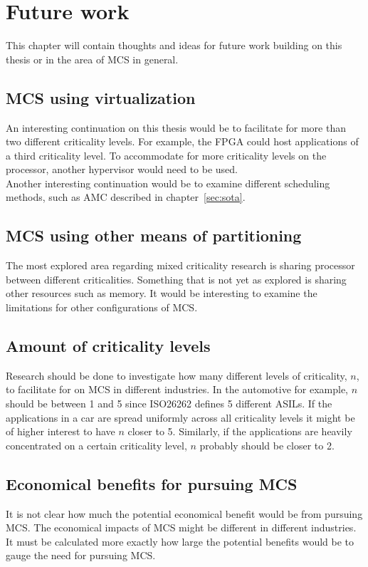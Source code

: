 \chapter{Future work}
\label{sec:future_work}
This chapter will contain thoughts and ideas for future work building on this thesis or in the area of MCS in general.

\section{MCS using virtualization}
An interesting continuation on this thesis would be to facilitate for more than two different criticality levels. For example, the FPGA could host applications of a third criticality level. To accommodate for more criticality levels on the processor, another hypervisor would need to be used.\\

Another interesting continuation would be to examine different scheduling methods, such as AMC described in chapter~\ref{sec:sota}.

\section{MCS using other means of partitioning}
The most explored area regarding mixed criticality research is sharing processor between different criticalities. Something that is not yet as explored is sharing other resources such as memory. It would be interesting to examine the limitations for other configurations of MCS. %

\section{Amount of criticality levels}
Research should be done to investigate how many different levels of criticality, $n$, to facilitate for on MCS in different industries. In the automotive for example, $n$ should be between 1 and 5 since ISO26262 defines 5 different ASILs. If the applications in a car are spread uniformly across all criticality levels it might be of higher interest to have $n$ closer to 5. Similarly, if the applications are heavily concentrated on a certain criticality level, $n$ probably should be closer to 2.

\section{Economical benefits for pursuing MCS}
It is not clear how much the potential economical benefit would be from pursuing MCS. The economical impacts of MCS might be different in different industries. It must be calculated more exactly how large the potential benefits would be to gauge the need for pursuing MCS.

